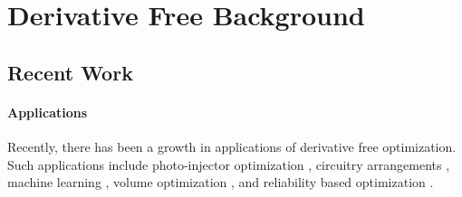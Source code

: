 \section{Derivative Free Background}
% 
% 
% 

\subsection{Recent Work}
\paragraph{Applications}
Recently, there has been a growth in applications of derivative free optimization.
Such applications include photo-injector optimization \cite{1742-6596-874-1-012062}, circuitry arrangements \cite{PLOSKAS201816}, machine learning \cite{KS2018}, volume optimization \cite{Cheng2017}, and reliability based optimization \cite{Gao2017}.

